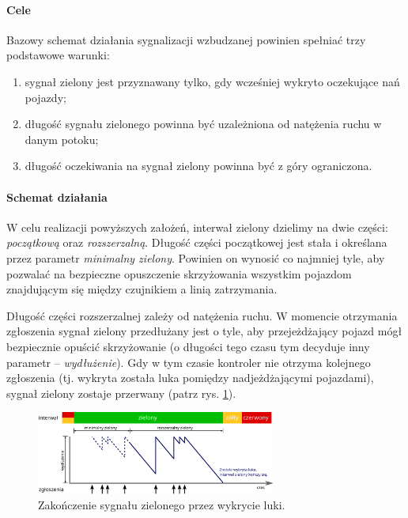 \documentclass{pracamgr}
\theoremstyle{plain}
\begin{document}
\paragraph{Cele} Bazowy schemat działania sygnalizacji wzbudzanej
powinien spełniać trzy podstawowe warunki:
\begin{enumerate}
  \item sygnał zielony jest przyznawany tylko, gdy wcześniej wykryto
oczekujące nań pojazdy;
  \item długość sygnału zielonego powinna być uzależniona od natężenia
ruchu w danym potoku;
  \item długość oczekiwania na sygnał zielony powinna być z góry
ograniczona.
\end{enumerate}

\paragraph{Schemat działania} W celu realizacji powyższych założeń,
interwał zielony dzielimy na dwie części: \emph{początkową} oraz
\emph{rozszerzalną}. Długość części początkowej jest stała i określana
przez parametr \emph{minimalny zielony}. Powinien on wynosić co
najmniej tyle, aby pozwalać na bezpieczne opuszczenie skrzyżowania
wszystkim pojazdom znajdującym się między czujnikiem a linią
zatrzymania.

Długość części rozszerzalnej zależy od natężenia ruchu. W momencie
otrzymania zgłoszenia sygnał zielony przedłużany jest o tyle, aby
przejeżdżający pojazd mógł bezpiecznie opuścić skrzyżowanie (o
długości tego czasu tym decyduje inny parametr --
\emph{wydłużenie}). Gdy w tym czasie kontroler nie otrzyma kolejnego
zgłoszenia (tj. wykryta została luka pomiędzy nadjeżdżającymi
pojazdami), sygnał zielony zostaje przerwany (patrz
rys. \ref{img:gap-out}).

\begin{figure}[ht] \centering
  \includegraphics[width=0.7\textwidth]{img/signals-gap-out}
  \caption{Zakończenie sygnału zielonego przez wykrycie luki.}
\label{img:gap-out}
\end{figure}
\end{document}
